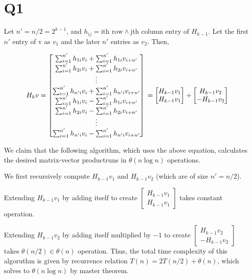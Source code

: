 \section*{Q1}

Let $n' = n/2 = 2^{k-1}$,
and $h_{ij} = \text{ith row} \land \text{jth column entry of } H_{k-1}$.
Let the first $n'$ entry of v as $v_1$ and the later $n'$ entries as $v_2$.
Then,

\begin{equation}
        H_{k}v = \begin{bmatrix}
            \sum_{i=1}^{n'} h_{1i}v_i + \sum_{i=1}^{n'} h_{1i} v_{i+n'} \\
            \sum_{i=1}^{n'} h_{2i}v_i + \sum_{i=1}^{n'} h_{2i} v_{i+n'} \\
            \vdots \\
            \sum_{i=1}^{n'} h_{n'i}v_i + \sum_{i=1}^{n'} h_{n'i} v_{i+n'} \\
            \sum_{i=1}^{n'} h_{1i}v_i - \sum_{i=1}^{n'} h_{1i} v_{i+n'} \\
            \sum_{i=1}^{n'} h_{2i}v_i - \sum_{i=1}^{n'} h_{2i} v_{i+n'} \\
            \vdots \\
            \sum_{i=1}^{n'} h_{n'i}v_i - \sum_{i=1}^{n'} h_{n'i} v_{i+n'}
        \end{bmatrix}\\
        = \begin{bmatrix}
            H_{k-1}v_1\\
            H_{k-1}v_1
        \end{bmatrix} + \begin{bmatrix}
            H_{k-1}v_2\\
            -H_{k-1}v_2
        \end{bmatrix}
\end{equation}

We claim that the following algorithm, which uses the above equation, calculates the desired matrix-vector productruns in $\theta(n\log n)$ operations.

We first recursively compute $H_{k-1}v_1$ and $H_{k-1}v_2$ (which are of size $n' = n/2$).

Extending $H_{k-1}v_1$ by adding itself to create $\begin{bmatrix}
    H_{k-1}v_1\\
    H_{k-1}v_1
\end{bmatrix}$ takes constant operation.

Extending $H_{k-1}v_2$ by adding itself multiplied by $-1$ to create $\begin{bmatrix}
    H_{k-1}v_2\\
    -H_{k-1}v_2
\end{bmatrix}$ takes $\theta(n/2) \in \theta(n)$ operation.
Thus, the total time complexity of this algoruthm is given by recurrence relation $T(n) = 2T(n/2) + \theta(n)$, which solves to $\theta(n\log n)$ by master theorem.

